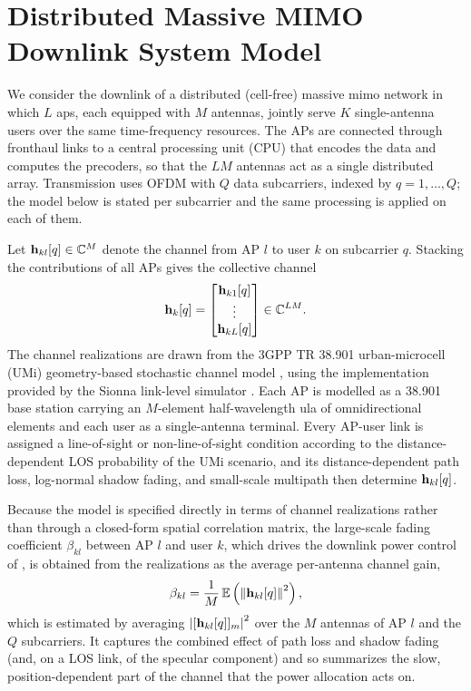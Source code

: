 \section{Distributed Massive MIMO Downlink System Model}
\label{sec:dmimo_dl_sysmodel}
We consider the downlink of a distributed (cell-free) massive \gls{mimo}
network in which $L$ \glspl{ap}, each equipped with $M$ antennas, jointly serve
$K$ single-antenna users over the same time-frequency resources. The APs are
connected through fronthaul links to a central processing unit (CPU) that
encodes the data and computes the precoders, so that the $LM$ antennas act as a
single distributed array. Transmission uses OFDM with $Q$ data subcarriers,
indexed by $q=1,\dots,Q$; the model below is stated per subcarrier and the same
processing is applied on each of them.

Let $\boldsymbol{\mathrm{h}}_{kl}[q]\in\mathbb{C}^{M}$ denote the channel from AP $l$ to user $k$ on
subcarrier $q$. Stacking the contributions of all APs gives the collective
channel
\begin{equation}
\label{eq:collective-channel}
\boldsymbol{\mathrm{h}}_{k}[q] =
\begin{bmatrix} \boldsymbol{\mathrm{h}}_{k1}[q] \\ \vdots \\ \boldsymbol{\mathrm{h}}_{kL}[q] \end{bmatrix}
\in\mathbb{C}^{LM}.
\end{equation}
The channel realizations are drawn from the 3GPP TR 38.901 urban-microcell
(UMi) geometry-based stochastic channel model \cite{tr38901}, using the
implementation provided by the Sionna link-level simulator
\cite{hoydis2022sionna}. Each AP is modelled as a 38.901 base station carrying
an $M$-element half-wavelength \gls{ula} of omnidirectional elements and each
user as a single-antenna terminal. Every AP-user link is assigned a line-of-sight
or non-line-of-sight condition according to the distance-dependent LOS
probability of the UMi scenario, and its distance-dependent path loss, log-normal
shadow fading, and small-scale multipath then determine $\boldsymbol{\mathrm{h}}_{kl}[q]$.

Because the model is specified directly in terms of channel realizations rather
than through a closed-form spatial correlation matrix, the large-scale fading
coefficient $\beta_{kl}$ between AP $l$ and user $k$, which drives the downlink
power control of , is obtained from the realizations as
the average per-antenna channel gain,
\begin{equation}
\label{eq:beta-estimate}
\beta_{kl} = \frac{1}{M}\,\mathbb{E}\left(\left\lVert\boldsymbol{\mathrm{h}}_{kl}[q]\right\rVert^{2}\right),
\end{equation}
which is estimated by averaging $\left\lvert[\boldsymbol{\mathrm{h}}_{kl}[q]]_{m}\right\rvert^{2}$ over the $M$
antennas of AP $l$ and the $Q$ subcarriers. It captures the combined effect of
path loss and shadow fading (and, on a LOS link, of the specular component) and
so summarizes the slow, position-dependent part of the channel that the power
allocation acts on.

